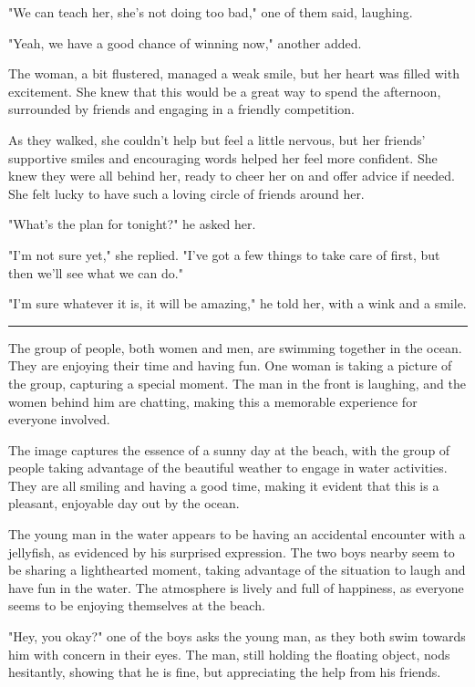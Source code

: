 \documentclass[smalldemyvopaper,11pt,twoside,onecolumn,openright,extrafontsizes]{memoir}
\begin{document}
"We can teach her, she's not doing too bad," one of them said, laughing.\par
"Yeah, we have a good chance of winning now," another added.\par
The woman, a bit flustered, managed a weak smile, but her heart was filled with excitement. She knew that this would be a great way to spend the afternoon, surrounded by friends and engaging in a friendly competition.\par
As they walked, she couldn't help but feel a little nervous, but her friends' supportive smiles and encouraging words helped her feel more confident. She knew they were all behind her, ready to cheer her on and offer advice if needed. She felt lucky to have such a loving circle of friends around her.\par
"What's the plan for tonight?" he asked her.\par
"I'm not sure yet," she replied. "I've got a few things to take care of first, but then we'll see what we can do."\par
"I'm sure whatever it is, it will be amazing," he told her, with a wink and a smile.\par
\fancybreak{* * *}
The group of people, both women and men, are swimming together in the ocean. They are enjoying their time and having fun. One woman is taking a picture of the group, capturing a special moment. The man in the front is laughing, and the women behind him are chatting, making this a memorable experience for everyone involved.\par
The image captures the essence of a sunny day at the beach, with the group of people taking advantage of the beautiful weather to engage in water activities. They are all smiling and having a good time, making it evident that this is a pleasant, enjoyable day out by the ocean.\par
The young man in the water appears to be having an accidental encounter with a jellyfish, as evidenced by his surprised expression. The two boys nearby seem to be sharing a lighthearted moment, taking advantage of the situation to laugh and have fun in the water. The atmosphere is lively and full of happiness, as everyone seems to be enjoying themselves at the beach.\par
"Hey, you okay?" one of the boys asks the young man, as they both swim towards him with concern in their eyes. The man, still holding the floating object, nods hesitantly, showing that he is fine, but appreciating the help from his friends.\par
\end{document}
